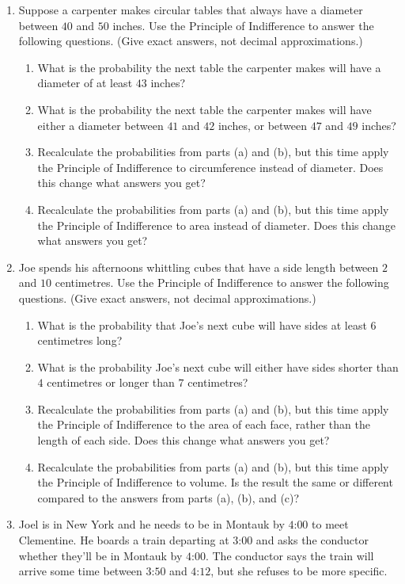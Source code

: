 \documentclass[justified]{tufte-book}
\providecommand{\tightlist}{%
  \setlength{\itemsep}{0pt}\setlength{\parskip}{0pt}}
\theoremstyle{definition}
\theoremstyle{definition}
\theoremstyle{definition}
\theoremstyle{remark}
\begin{document}
\begin{enumerate}
\item
  Suppose a carpenter makes circular tables that always have a diameter between \(40\) and \(50\) inches. Use the Principle of Indifference to answer the following questions. (Give exact answers, not decimal approximations.)

  \begin{enumerate}
  \def\labelenumii{\alph{enumii}.}
  \tightlist
  \item
    What is the probability the next table the carpenter makes will have a diameter of at least \(43\) inches?
  \item
    What is the probability the next table the carpenter makes will have either a diameter between \(41\) and \(42\) inches, or between \(47\) and \(49\) inches?
  \item
    Recalculate the probabilities from parts (a) and (b), but this time apply the Principle of Indifference to circumference instead of diameter. Does this change what answers you get?
  \item
    Recalculate the probabilities from parts (a) and (b), but this time apply the Principle of Indifference to area instead of diameter. Does this change what answers you get?
  \end{enumerate}
\item
  Joe spends his afternoons whittling cubes that have a side length between \(2\) and \(10\) centimetres. Use the Principle of Indifference to answer the following questions. (Give exact answers, not decimal approximations.)

  \begin{enumerate}
  \def\labelenumii{\alph{enumii}.}
  \tightlist
  \item
    What is the probability that Joe's next cube will have sides at least \(6\) centimetres long?
  \item
    What is the probability Joe's next cube will either have sides shorter than \(4\) centimetres or longer than \(7\) centimetres?
  \item
    Recalculate the probabilities from parts (a) and (b), but this time apply the Principle of Indifference to the area of each face, rather than the length of each side. Does this change what answers you get?
  \item
    Recalculate the probabilities from parts (a) and (b), but this time apply the Principle of Indifference to volume. Is the result the same or different compared to the answers from parts (a), (b), and (c)?
  \end{enumerate}
\item
  Joel is in New York and he needs to be in Montauk by \(4\):\(00\) to meet Clementine. He boards a train departing at \(3\):\(00\) and asks the conductor whether they'll be in Montauk by \(4\):\(00\). The conductor says the train will arrive some time between \(3\):\(50\) and \(4\):\(12\), but she refuses to be more specific.


\end{enumerate}
\end{document}
